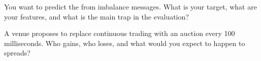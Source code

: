 \begin{interviewq}\label{iq:m1:auctions:5}
You want to predict the  from imbalance messages. What is your
target, what are your features, and what is the main trap in the
evaluation?
\end{interviewq}

\begin{interviewq}\label{iq:m1:auctions:6}
A venue proposes to replace continuous trading with an auction every 100
milliseconds. Who gains, who loses, and what would you expect to happen to
spreads?
\end{interviewq}
